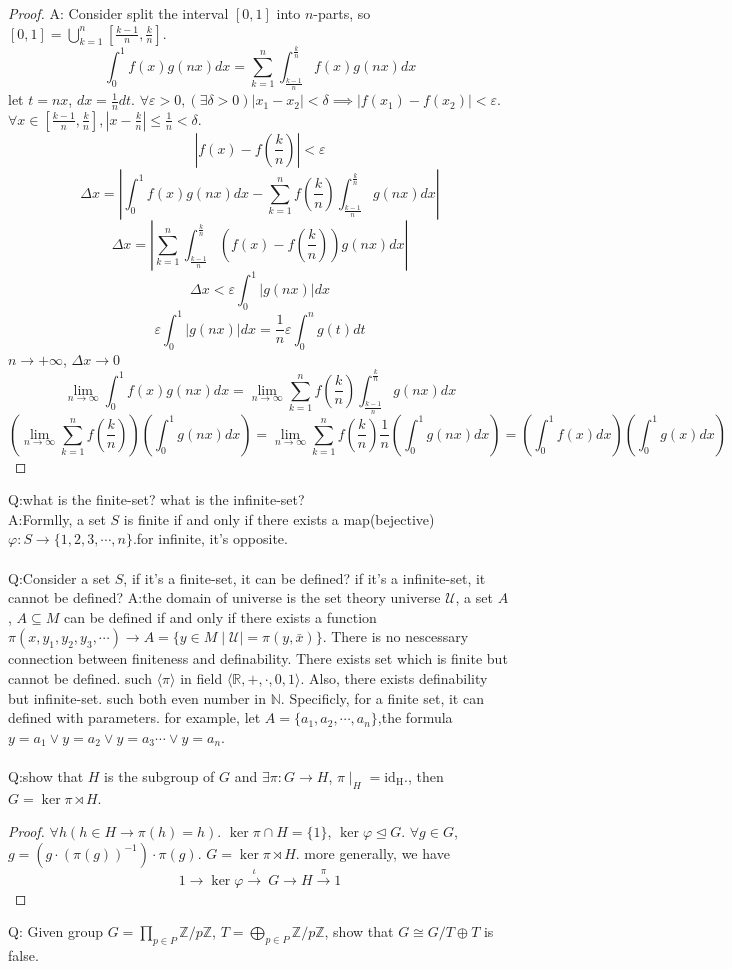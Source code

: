 \documentclass[10pt,a4paper]{article}
\begin{document}
\begin{proof}
A: Consider split the interval $[0,1]$ into $n$-parts, so $[0,1]=\bigcup\limits_{k=1}^{n}[\frac{k-1}{n},\frac{k}{n}]$.
\[\int_{0}^{1}f(x)g(nx)dx=\sum\limits_{k=1}^{n}\int_{\frac{k-1}{n}}^{\frac{k}{n}}f(x)g(nx)dx\]let $t=nx$, $dx=\frac{1}{n}dt$.
$\forall\varepsilon>0,(\exists\delta>0)|x_1-x_2|<\delta\implies|f(x_1)-f(x_2)|<\varepsilon$. $\forall x\in[\frac{k-1}{n},\frac{k}{n}],|x-\frac{k}{n}|\le\frac{1}{n}<\delta$.
\[|f(x)-f(\frac{k}{n})|<\varepsilon\]
\[\Delta x=|\int_{0}^{1}f(x)g(nx)dx-\sum\limits_{k=1}^{n}f(\frac{k}{n})\int_{\frac{k-1}{n}}^{\frac{k}{n}}g(nx)dx|\]
\[\Delta x=|\sum\limits_{k=1}^{n}\int_{\frac{k-1}{n}}^{\frac{k}{n}}(f(x)-f(\frac{k}{n}))g(nx)dx|\]
\[\Delta x<\varepsilon\int_{0}^{1}|g(nx)|dx\]
\[\varepsilon\int_{0}^{1}|g(nx)|dx=\frac{1}{n}\varepsilon\int_{0}^{n}g(t)dt\]
$n\to+\infty$, $\Delta x\to0$
\[\lim\limits_{n\to\infty}\int_{0}^{1}f(x)g(nx)dx=\lim\limits_{n\to\infty}\sum\limits_{k=1}^{n}f(\frac{k}{n})\int_{\frac{k-1}{n}}^{\frac{k}{n}}g(nx)dx\]
\[(\lim\limits_{n\to\infty}\sum\limits_{k=1}^{n}f(\frac{k}{n}))(\int_{0}^{1}g(nx)dx)=\lim\limits_{n\to\infty}\sum\limits_{k=1}^{n}f(\frac{k}{n})\frac{1}{n}(\int_{0}^{1}g(nx)dx)=(\int_{0}^{1}f(x)dx)(\int_{0}^{1}g(x)dx)\]
\end{proof}
Q:what is the finite-set? what is the infinite-set?\\
A:Formlly, a set $S$ is finite if and only if there exists a map(bejective) $\varphi:S\to\{1,2,3,\cdots,n\}$.for infinite, it's opposite.
\\
\\
Q:Consider a set $S$, if it's a finite-set, it can be defined? if it's a infinite-set, it cannot be defined?
A:the domain of universe is the set theory universe $\mathscr{U}$, a set $A$, $A\subseteq M$ can be defined if and only if there exists a function $\pi(x,y_1,y_2,y_3,\cdots)\rightarrow A=\{y\in M\mid\mathscr{U}|=\pi(y,\bar{x})\}$.
There is no nescessary connection between finiteness and definability. There exists set which is finite but cannot be defined. such $\langle\pi\rangle$ in field $\langle\mathbb{R},+,\cdot,0,1\rangle$. Also, there exists definability but infinite-set. such both even number in $\mathbb{N}$.
Specificly, for a finite set, it can defined with parameters. for example, let $A=\{a_1,a_2,\cdots,a_n\}$,the formula $y=a_1\lor y=a_2\lor y=a_3\cdots\lor y=a_n$.
\\
\\
Q:show that $H$ is the subgroup of $G$ and  $\exists\pi:G\to H$, $\pi\mid_H=\mathrm{id_H.}$, then $G=\ker\pi\rtimes H$.
\begin{proof}
   $\forall h(h\in H\rightarrow \pi(h)=h)$. $\ker\pi\cap H=\{1\}$, $\ker\varphi\trianglelefteq G$. $\forall g\in G$, $g=(g\cdot(\pi(g))^{-1})\cdot\pi(g)$.
    $G=\ker\pi\rtimes H$. more generally, we have 
    \[1\longrightarrow\ker\varphi\overset{\iota}\longrightarrow\ G\longrightarrow H\overset{\pi}\longrightarrow1\]
\end{proof}
Q: Given group $G=\prod\limits_{p\in P}\mathbb{Z}/p\mathbb{Z}$, $T=\bigoplus\limits_{p\in P}\mathbb{Z}/p\mathbb{Z}$, show that $G\cong G/T\oplus T$ is false. 
\end{document}
